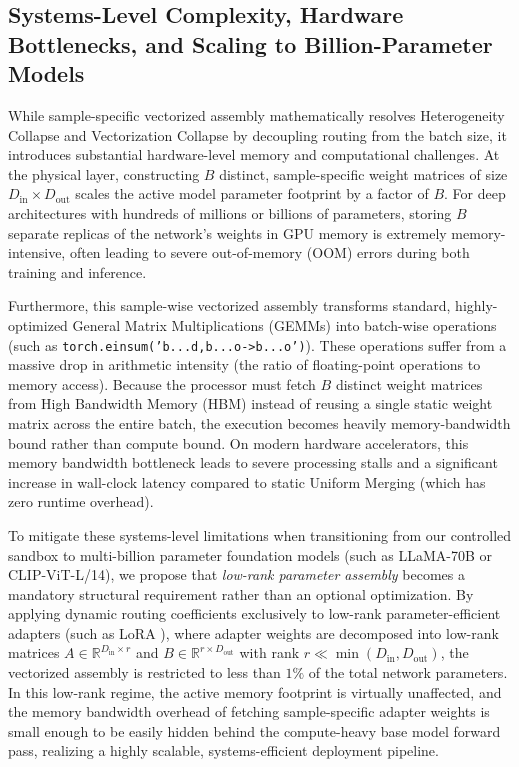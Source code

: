 \subsection{Systems-Level Complexity, Hardware Bottlenecks, and Scaling to Billion-Parameter Models}
\label{subsec:systems_complexity}
While sample-specific vectorized assembly mathematically resolves Heterogeneity Collapse and Vectorization Collapse by decoupling routing from the batch size, it introduces substantial hardware-level memory and computational challenges. At the physical layer, constructing $B$ distinct, sample-specific weight matrices of size $D_{\text{in}} \times D_{\text{out}}$ scales the active model parameter footprint by a factor of $B$. For deep architectures with hundreds of millions or billions of parameters, storing $B$ separate replicas of the network's weights in GPU memory is extremely memory-intensive, often leading to severe out-of-memory (OOM) errors during both training and inference.

Furthermore, this sample-wise vectorized assembly transforms standard, highly-optimized General Matrix Multiplications (GEMMs) into batch-wise operations (such as \texttt{torch.einsum('b...d,b...o->b...o')}). These operations suffer from a massive drop in arithmetic intensity (the ratio of floating-point operations to memory access). Because the processor must fetch $B$ distinct weight matrices from High Bandwidth Memory (HBM) instead of reusing a single static weight matrix across the entire batch, the execution becomes heavily memory-bandwidth bound rather than compute bound. On modern hardware accelerators, this memory bandwidth bottleneck leads to severe processing stalls and a significant increase in wall-clock latency compared to static Uniform Merging (which has zero runtime overhead).

To mitigate these systems-level limitations when transitioning from our controlled sandbox to multi-billion parameter foundation models (such as LLaMA-70B or CLIP-ViT-L/14), we propose that \emph{low-rank parameter assembly} becomes a mandatory structural requirement rather than an optional optimization. By applying dynamic routing coefficients exclusively to low-rank parameter-efficient adapters (such as LoRA \cite{hu2021lora}), where adapter weights are decomposed into low-rank matrices $A \in \mathbb{R}^{D_{\text{in}} \times r}$ and $B \in \mathbb{R}^{r \times D_{\text{out}}}$ with rank $r \ll \min(D_{\text{in}}, D_{\text{out}})$, the vectorized assembly is restricted to less than $1\%$ of the total network parameters. In this low-rank regime, the active memory footprint is virtually unaffected, and the memory bandwidth overhead of fetching sample-specific adapter weights is small enough to be easily hidden behind the compute-heavy base model forward pass, realizing a highly scalable, systems-efficient deployment pipeline.
